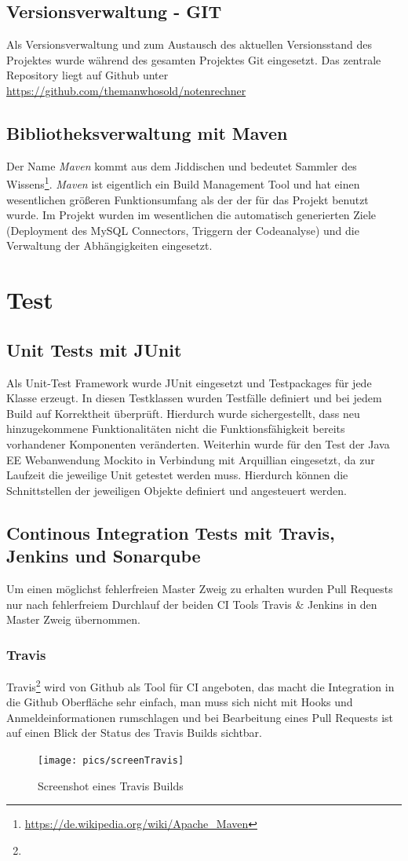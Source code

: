 \documentclass[12pt,a4paper,parskip]{scrreprt}
\begin{document}
\subsection{Versionsverwaltung - GIT}
Als Versionsverwaltung und zum Austausch des aktuellen Versionsstand des Projektes wurde während des gesamten Projektes Git eingesetzt. Das zentrale Repository liegt auf Github unter \url{https://github.com/themanwhosold/notenrechner}
\subsection{Bibliotheksverwaltung mit Maven}
Der Name \textit{Maven} kommt aus dem Jiddischen und bedeutet
\glqq Sammler des Wissens\grqq \footnote{\url{https://de.wikipedia.org/wiki/Apache_Maven}}.
\textit{Maven} ist eigentlich ein Build Management Tool und hat einen wesentlichen größeren Funktionsumfang als der der für das Projekt benutzt wurde. Im Projekt wurden im wesentlichen die automatisch generierten Ziele (Deployment des MySQL Connectors, Triggern der Codeanalyse) und die Verwaltung der Abhängigkeiten eingesetzt.
\section{Test}
\subsection{Unit Tests mit JUnit}
Als Unit-Test Framework wurde JUnit eingesetzt und Testpackages für jede Klasse erzeugt. In diesen Testklassen wurden Testfälle definiert und bei jedem Build auf Korrektheit überprüft. Hierdurch wurde sichergestellt, dass neu hinzugekommene Funktionalitäten nicht die Funktionsfähigkeit bereits vorhandener Komponenten veränderten.
Weiterhin wurde für den Test der Java EE Webanwendung Mockito in Verbindung mit Arquillian eingesetzt, da zur Laufzeit die jeweilige Unit getestet werden muss. Hierdurch können die Schnittstellen der jeweiligen Objekte definiert und angesteuert werden.
\subsection{Continous Integration Tests mit Travis, Jenkins und Sonarqube}
Um einen möglichst fehlerfreien Master Zweig zu erhalten wurden Pull Requests nur nach fehlerfreiem Durchlauf der beiden CI Tools Travis \& Jenkins in den Master Zweig übernommen.

\subsubsection{Travis}
Travis\footnote{} wird von Github als Tool für CI angeboten, das macht die Integration in die Github Oberfläche sehr einfach, man muss sich nicht mit Hooks und Anmeldeinformationen rumschlagen und bei Bearbeitung eines Pull Requests ist auf einen Blick der Status des Travis Builds sichtbar.
\begin{figure}[!hbtp]%
\centering
\texttt{[image: pics/screenTravis]}
\caption[Travis]{Screenshot eines Travis Builds}
\label{fig:screenTravis}
\end{figure}
\end{document}
